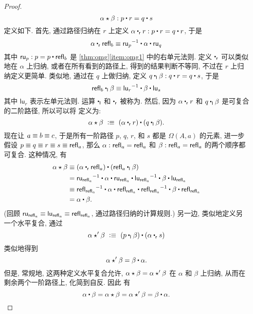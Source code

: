 \begin{proof}
    \begin{equation*}
        \alpha\hct\beta : p\ct r = q\ct s
    \end{equation*}
%
    定义如下.
    首先, 通过路径归纳在 $r$ 上定义 $\alpha \rightwhisker r : p\ct r = q\ct r$, 于是
    \[
        \alpha \rightwhisker \refl{b} \jdeq \opp{\mathsf{ru}_p} \ct \alpha \ct \mathsf{ru}_q
    \]
    其中 $\mathsf{ru}_p : p = p \ct \refl{b}$ 是 \cref{thm:omg}\ref{item:omg1} 中的右单元法则.
    定义 $\rightwhisker$ 可以类似地在 $\alpha$ 上归纳, 或者在所有看到的路径上, 得到的结果判断不等同, 不过在 $r$ 上归纳定义更简单.
    类似地, 通过在 $q$ 上做归纳, 定义 $q\leftwhisker \beta : q\ct r = q\ct s$, 于是
    \[ \refl{b} \leftwhisker \beta \jdeq \opp{\mathsf{lu}_r} \ct \beta \ct \mathsf{lu}_s \]
    其中 $\mathsf{lu}_r$ 表示左单元法则.
    运算 $\leftwhisker$ 和 $\rightwhisker$ 被称为.
    然后, 因为 $\alpha \rightwhisker r$ 和 $q\leftwhisker \beta$ 是可复合的二阶路径, 所以可以将%
    定义为:
    \[
        \alpha\hct\beta\ \defeq\ (\alpha\rightwhisker r) \ct (q\leftwhisker \beta).
    \]
    现在让 $a \equiv b \equiv c$, 于是所有一阶路径 $p$, $q$, $r$, 和 $s$ 都是  $\Omega(A,a)$ 的元素, 进一步假设 $p\equiv q \equiv r \equiv s\equiv \mathsf{refl}_{a}$, 那么 $\alpha:\mathsf{refl}_{a} = \mathsf{refl}_{a}$ 和 $\beta:\mathsf{refl}_{a} = \mathsf{refl}_{a}$ 的两个顺序都可复合.
    这种情况, 有
    \begin{align*}
        \alpha\hct\beta
        &\jdeq (\alpha\rightwhisker\refl{a}) \ct (\refl{a}\leftwhisker \beta)\\
        &= \opp{\mathsf{ru}_{\refl{a}}} \ct \alpha \ct \mathsf{ru}_{\refl{a}} \ct \opp{\mathsf{lu}_{\refl a}} \ct \beta \ct \mathsf{lu}_{\refl{a}}\\
        &\jdeq \opp{\refl{\refl{a}}} \ct \alpha \ct \refl{\refl{a}} \ct \opp{\refl{\refl a}} \ct \beta \ct \refl{\refl{a}}\\
        &= \alpha \ct \beta.
    \end{align*}
    (回顾 $\mathsf{ru}_{\mathsf{refl}_{a}} \equiv \mathsf{lu}_{\mathsf{refl}_{a}} \equiv \mathsf{refl}_{\mathsf{refl}_{a}}$, 通过路径归纳的计算规则.)
    另一边, 类似地定义另一个水平复合, 通过
    \[
        \alpha\hct'\beta\ \defeq\ (p\leftwhisker \beta)\ct (\alpha\rightwhisker s)
    \]
    类似地得到
    \[
        \alpha\hct'\beta = \beta\ct\alpha.
    \]
    但是, 常规地, 这两种定义水平复合允许, $\alpha\star\beta = \alpha\star'\beta$ 在 $\alpha$ 和 $\beta$ 上归纳, 从而在剩余两个一阶路径上, 化简到自反.
    因此 有
    \[\alpha \ct \beta = \alpha\hct\beta = \alpha\hct'\beta = \beta\ct\alpha.
    \qedhere
    \]
\end{proof}

